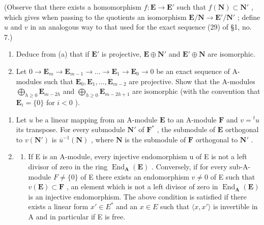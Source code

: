 (Observe that there exists a homomorphism \(f \colon \mathbf{E} \to \mathbf{E}'\) such that \(f(\mathbf{N}) \subset \mathbf{N}'\) , which gives when passing to the quotients an isomorphism \(\mathbf{E} / \mathbf{N} \to \mathbf{E}' / \mathbf{N}'\) ; define \(u\) and \(v\) in an analogous way to that used for the exact sequence (29) of §1, no. 7.)

\begin{enumerate}
\def\labelenumi{(\alph{enumi})}
\setcounter{enumi}{1}
\item
  Deduce from (a) that if \(\mathbf{E}'\) is projective, \(\mathbf{E} \oplus \mathbf{N}'\) and \(\mathbf{E}' \oplus \mathbf{N}\) are isomorphic.
\item
  Let \(0 \to \mathbf{E}_m \to \mathbf{E}_{m-1} \to \ldots \to \mathbf{E}_1 \to \mathbf{E}_0 \to 0\) be an exact sequence of A-modules such that \(\mathbf{E}_0, \mathbf{E}_1, \ldots, \mathbf{E}_{m-2}\) are projective. Show that the A-modules \(\bigoplus_{h \geqslant 0} \mathbf{E}_{m-2h}\) and \(\bigoplus_{h \geqslant 0} \mathbf{E}_{m-2h+1}\) are isomorphic (with the convention that \(\mathbf{E}_i = \{0\}\) for \(i < 0\) ).
\end{enumerate}

\begin{enumerate}
\def\labelenumi{\arabic{enumi}.}
\setcounter{enumi}{4}
\item
  Let \(u\) be a linear mapping from an A-module \(\mathbf{E}\) to an A-module \(\mathbf{F}\) and \(v = {}^t u\) its transpose. For every submodule \(\mathbf{N}'\) of \(\mathbf{F}^*\) , the submodule of \(\mathbf{E}\) orthogonal to \(v(\mathbf{N}')\) is \(\overline{u}^{-1}(\mathbf{N})\) , where \(\mathbf{N}\) is the submodule of \(\mathbf{F}\) orthogonal to \(\mathbf{N}'\) .
\item
  \begin{enumerate}
  \def\labelenumii{(\alph{enumii})}
  \tightlist
  \item
    If E is an A-module, every injective endomorphism u of E is not a left divisor of zero in the ring \(\operatorname{End}_{\mathbf{A}}(\mathbf{E})\) . Conversely, if for every sub-A-module \(F \neq \{0\}\) of E there exists an endomorphism \(v \neq 0\) of E such that \(v(\mathbf{E}) \subset \mathbf{F}\) , an element which is not a left divisor of zero in \(\operatorname{End}_{\mathbf{A}}(\mathbf{E})\) is an injective endomorphism. The above condition is satisfied if there exists a linear form \(x' \in E^*\) and an \(x \in E\) such that \(\langle x, x' \rangle\) is invertible in A and in particular if E is free.
  \end{enumerate}
\end{enumerate}


